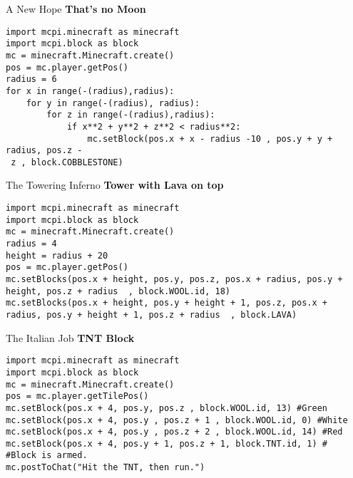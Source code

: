 \documentclass[flashcard_land,grid]{flashcards}
\begin{document}
\begin{flashcard}[API]{A New Hope}
{\bf That's no Moon}
\begin{lstlisting}
import mcpi.minecraft as minecraft
import mcpi.block as block
mc = minecraft.Minecraft.create()
pos = mc.player.getPos()
radius = 6
for x in range(-(radius),radius):
    for y in range(-(radius), radius):
        for z in range(-(radius),radius):
            if x**2 + y**2 + z**2 < radius**2:
                mc.setBlock(pos.x + x - radius -10 , pos.y + y + radius, pos.z -
 z , block.COBBLESTONE)
\end{lstlisting}
\end{flashcard}


\begin{flashcard}[API]{The Towering Inferno}
{\bf Tower with Lava on top}
\begin{lstlisting}
import mcpi.minecraft as minecraft
import mcpi.block as block
mc = minecraft.Minecraft.create()
radius = 4
height = radius + 20 
pos = mc.player.getPos()
mc.setBlocks(pos.x + height, pos.y, pos.z, pos.x + radius, pos.y + height, pos.z + radius  , block.WOOL.id, 18)
mc.setBlocks(pos.x + height, pos.y + height + 1, pos.z, pos.x + radius, pos.y + height + 1, pos.z + radius  , block.LAVA)
\end{lstlisting}
\end{flashcard}


\begin{flashcard}[API]{The Italian Job}
{\bf TNT Block }
\begin{lstlisting}
import mcpi.minecraft as minecraft
import mcpi.block as block
mc = minecraft.Minecraft.create()
pos = mc.player.getTilePos()
mc.setBlock(pos.x + 4, pos.y, pos.z , block.WOOL.id, 13) #Green
mc.setBlock(pos.x + 4, pos.y , pos.z + 1 , block.WOOL.id, 0) #White
mc.setBlock(pos.x + 4, pos.y , pos.z + 2 , block.WOOL.id, 14) #Red
mc.setBlock(pos.x + 4, pos.y + 1, pos.z + 1, block.TNT.id, 1) #
#Block is armed.
mc.postToChat("Hit the TNT, then run.")
\end{lstlisting}
\end{flashcard}
\end{document}
